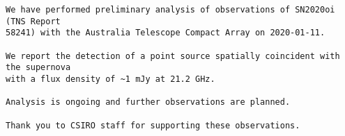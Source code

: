 \begin{verbatim}
We have performed preliminary analysis of observations of SN2020oi (TNS Report
58241) with the Australia Telescope Compact Array on 2020-01-11.

We report the detection of a point source spatially coincident with the supernova
with a flux density of ~1 mJy at 21.2 GHz.

Analysis is ongoing and further observations are planned.

Thank you to CSIRO staff for supporting these observations.
\end{verbatim}

\endgroup
